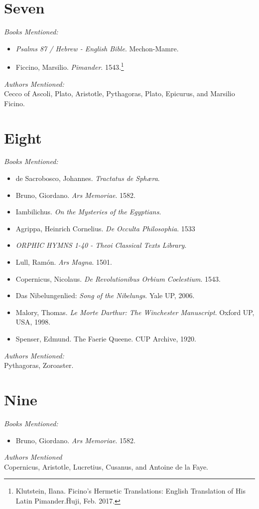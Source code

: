 \documentclass[twoside,10pt]{report}
\begin{document}
\section{Seven}
\textit{Books Mentioned:}
\begin{itemize}
\item \textit{Psalms 87 / Hebrew - English Bible}. Mechon-Mamre. \cite{MechonMamre}
\item Ficcino, Marsilio. \textit{Pimander}. 1543.\cite{Ficcino1543}\footnote{Klutstein, Ilana. \"Ficino’s Hermetic Translations: English Translation of His Latin Pimander.\" Huji, Feb. 2017.}
\end{itemize}
\textit{Authors Mentioned:}\\
Cecco of Ascoli, Plato, Aristotle, Pythagoras, Plato, Epicurus, and Marsilio Ficino.

\section{Eight}
\textit{Books Mentioned:}
\begin{itemize}
\item de Sacrobosco, Johannes. \textit{Tractatus de Sphæra}.\cite{De}
\item Bruno, Giordano. \textit{Ars Memoriae}. 1582.\cite{Brunoa}
\item Iambilichus. \textit{On the Mysteries of the Egyptians}.\cite{Iambilichus}
\item Agrippa, Heinrich Cornelius. \textit{De Occulta Philosophia}. 1533\cite{Agrippa}
\item \textit{ORPHIC HYMNS 1-40 - Theoi Classical Texts Library}.\cite{Orphic}
\item Lull, Ramón. \textit{Ars Magna}. 1501.\cite{Lull1501}
\item Copernicus, Nicolaus. \textit{De Revolutionibus Orbium Coelestium}. 1543.\cite{Copernicus1543}
\item Das Nibelungenlied: \textit{Song of the Nibelungs}. Yale UP, 2006.\cite{Das2006}
\item Malory, Thomas. \textit{Le Morte Darthur: The Winchester Manuscript}. Oxford UP, USA, 1998.\cite{Malory1998}
\item Spenser, Edmund. The Faerie Queene. CUP Archive, 1920.\cite{Spenser1920}
\end{itemize}
\textit{Authors Mentioned:}\\
Pythagoras, Zoroaster.

\section{Nine}
\textit{Books Mentioned:}
\begin{itemize}
\item Bruno, Giordano. \textit{Ars Memoriae}. 1582.\cite{Brunoa}
\end{itemize}
\textit{Authors Mentioned}\\
Copernicus, Aristotle, Lucretius, Cusanus, and Antoine de la Faye.
\end{document}
